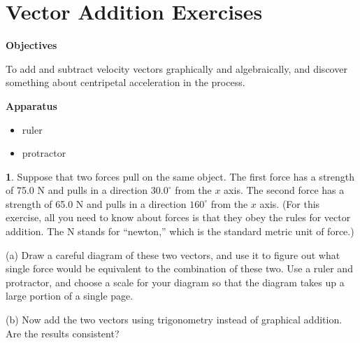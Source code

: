 
\section{Vector Addition Exercises}
\label{vector_addition_exercises}

\makelabheader %

\bigskip

\textbf{Objectives}

To add and subtract velocity vectors graphically and algebraically, and discover something about centripetal acceleration in the process.

\bigskip

\textbf{Apparatus}
\begin{itemize} \itemsep1pt
\item ruler
\item protractor 
\end{itemize}

\bigskip

{\bf 1}.
Suppose that two forces pull on the same object.  The first force has
a strength of 75.0 N and pulls in a direction $30.0^\circ$ from the $x$
axis.  The second force has a strength of 65.0 N and pulls in a direction 
$160^\circ$ from the $x$ axis.  (For this exercise, all you need
to know about forces is that they obey the rules for vector addition.
The N stands for ``newton,'' which is the standard metric unit of force.)

(a) Draw a careful diagram of these two vectors, and use it to figure out
what single force would be equivalent to the combination of these two.
Use a ruler and protractor, and choose a scale for your diagram so that
the diagram takes up a large portion of a single page.

(b) Now add the two vectors using 
trigonometry instead
of graphical addition.  Are the results consistent?

